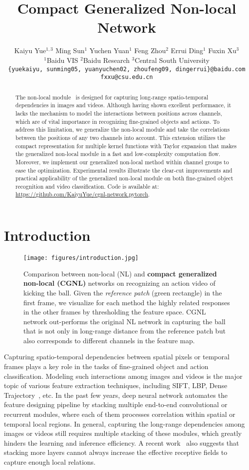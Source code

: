 \documentclass{article}
\title{Compact Generalized Non-local Network}
\author{
  \vspace{1mm} %
  Kaiyu Yue$^{1,3}$\quad
  Ming Sun$^{1}$\quad
  Yuchen Yuan$^{1}$\quad
  Feng Zhou$^{2}$\quad
  Errui Ding$^{1}$\quad
  Fuxin Xu$^{3}$\quad\\
  \vspace{1mm} %
  $^{1}$Baidu VIS\quad
  $^{2}$Baidu Research\quad
  $^{3}$Central South University\\
  \texttt{\{yuekaiyu, sunming05, yuanyuchen02, zhoufeng09, dingerrui\}@baidu.com}\\
  \texttt{fxxu@csu.edu.cn}
}
\begin{document}
\maketitle
\begin{abstract}
The non-local module~\cite{non-local} is designed for capturing long-range spatio-temporal dependencies in images and videos.
Although having shown excellent performance, it lacks the mechanism to model the interactions between positions across channels, which are of vital importance in recognizing fine-grained objects and actions.
To address this limitation, we generalize the non-local module and take the correlations between the positions of any two channels into account.
This extension utilizes the compact representation for multiple kernel functions with Taylor expansion that makes the generalized non-local module in a fast and low-complexity computation flow.
Moreover, we implement our generalized non-local method within channel groups to ease the optimization.
Experimental results illustrate the clear-cut improvements and practical applicability of the generalized non-local module on both fine-grained object recognition and video classification.
Code is available at: \url{https://github.com/KaiyuYue/cgnl-network.pytorch}.
\end{abstract}
\section{Introduction}
\begin{figure}[ht]
  \centering
  \texttt{[image: figures/introduction.jpg]}
  \caption{\small{
    Comparison between non-local (NL) and \textbf{compact generalized non-local (CGNL)} networks on recognizing an action video of kicking the ball.
    Given the \emph{reference patch} (green rectangle) in the first frame, we visualize for each method the highly related responses in the other frames by thresholding the feature space.
    CGNL network out-performs the original NL network in capturing the ball that is not only in long-range distance from the reference patch but also corresponds to different channels in the feature map.
  }}
\label{fig:introduction}
\end{figure}
Capturing spatio-temporal dependencies between spatial pixels or temporal frames plays a key role in the tasks of fine-grained object and action classification.
Modeling such interactions among images and videos is the major topic of various feature extraction techniques, including SIFT, LBP, Dense Trajectory~\cite{dense_trajectories}, etc.
In the past few years, deep neural network automates the feature designing pipeline by stacking multiple end-to-end convolutional or recurrent modules, where each of them processes correlation within spatial or temporal local regions.
In general, capturing the long-range dependencies among images or videos still requires multiple stacking of these modules, which greatly hinders the learning and inference efficiency.
A recent work~\cite{understanding_receptive_field} also suggests that stacking more layers cannot always increase the effective receptive fields to capture enough local relations.
\end{document}

